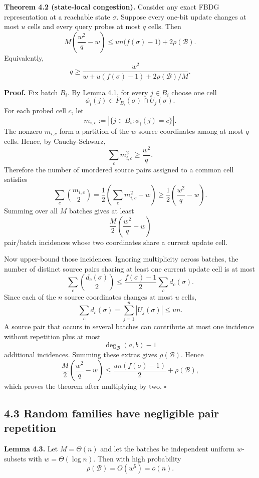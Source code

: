 \documentclass[
]{article}
\begin{document}
\textbf{Theorem 4.2 (state-local congestion).} Consider any exact FBDG
representation at a reachable state \(\sigma\). Suppose every one-bit
update changes at most \(u\) cells and every query probes at most \(q\)
cells. Then \[
\boxed{
M\left(\frac{w^2}{q}-w\right)
\le
un\bigl(f(\sigma)-1\bigr)+2\rho(\mathcal B).
}
\] Equivalently, \[
q
\ge
\frac{w^2}
{w+u(f(\sigma)-1)+2\rho(\mathcal B)/M}.
\]

\textbf{Proof.} Fix batch \(B_i\). By Lemma 4.1, for every \(j\in B_i\)
choose one cell \[
\phi_i(j)\in P_{B_i}(\sigma)\cap U_j(\sigma).
\] For each probed cell \(c\), let \[
m_{i,c}:=|\{j\in B_i:\phi_i(j)=c\}|.
\] The nonzero \(m_{i,c}\) form a partition of the \(w\) source
coordinates among at most \(q\) cells. Hence, by Cauchy-Schwarz, \[
\sum_c m_{i,c}^2\ge\frac{w^2}{q}.
\] Therefore the number of unordered source pairs assigned to a common
cell satisfies \[
\sum_c\binom{m_{i,c}}2
=
\frac12\left(\sum_c m_{i,c}^2-w\right)
\ge
\frac12\left(\frac{w^2}{q}-w\right).
\] Summing over all \(M\) batches gives at least \[
\frac M2\left(\frac{w^2}{q}-w\right)
\] pair/batch incidences whose two coordinates share a current update
cell.

Now upper-bound those incidences. Ignoring multiplicity across batches,
the number of distinct source pairs sharing at least one current update
cell is at most \[
\sum_c\binom{d_c(\sigma)}2
\le
\frac{f(\sigma)-1}{2}\sum_c d_c(\sigma).
\] Since each of the \(n\) source coordinates changes at most \(u\)
cells, \[
\sum_c d_c(\sigma)
=
\sum_{j=1}^n|U_j(\sigma)|
\le un.
\] A source pair that occurs in several batches can contribute at most
one incidence without repetition plus at most \[
\deg_{\mathcal B}(a,b)-1
\] additional incidences. Summing these extras gives
\(\rho(\mathcal B)\). Hence \[
\frac M2\left(\frac{w^2}{q}-w\right)
\le
\frac{un(f(\sigma)-1)}2+\rho(\mathcal B),
\] which proves the theorem after multiplying by two. \(\square\)

\hypertarget{random-families-have-negligible-pair-repetition}{%
\subsection{4.3 Random families have negligible pair
repetition}\label{random-families-have-negligible-pair-repetition}}

\textbf{Lemma 4.3.} Let \(M=\Theta(n)\) and let the batches be
independent uniform \(w\)-subsets with \(w=\Theta(\log n)\). Then with
high probability \[
\rho(\mathcal B)=O(w^5)=o(n).
\]
\end{document}
